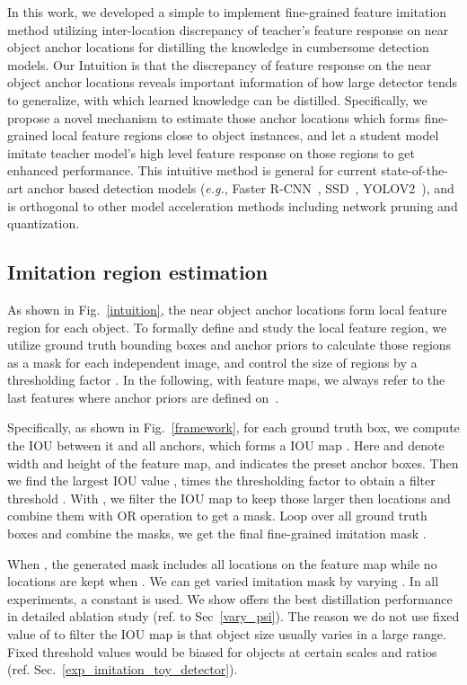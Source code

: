 \documentclass[10pt,twocolumn,letterpaper]{article}
\begin{document}
In this work, we developed a simple to implement fine-grained feature imitation method utilizing inter-location discrepancy of teacher's feature response on near object anchor locations for distilling the knowledge in cumbersome detection models. Our Intuition is that the discrepancy of feature response on the near object anchor locations reveals important information of how large detector tends to generalize, with which learned knowledge can be distilled. Specifically, we propose a novel mechanism to estimate those anchor locations which forms fine-grained local feature regions close to object instances, and let a student model imitate teacher model's high level feature response on those regions to get enhanced performance. This intuitive method is general for current state-of-the-art anchor based detection models (\textit{e.g.}, Faster R-CNN~\cite{ren2015faster}, SSD~\cite{liu2016ssd}, YOLOV2~\cite{redmon2017yolo9000}), and is orthogonal to other model acceleration methods including network pruning and quantization.


\subsection{Imitation region estimation}
\label{sec_imitation_method}

As shown in Fig.~\ref{intuition}, the near object anchor locations form local feature region for each object. To formally define and study the local feature region,  we utilize ground truth bounding boxes and anchor priors to calculate those regions as a mask  for each independent image, and control the size of regions by a thresholding factor . In the following, with feature maps, we always refer to the  last features where anchor priors are defined on~\cite{ren2015faster}.

Specifically, as shown in Fig.~\ref{framework}, for each ground truth box, we compute the IOU between it and all anchors, which forms a  IOU map . Here  and  denote  width and height of the feature map, and  indicates the  preset anchor boxes. Then we find the largest IOU value , times the thresholding factor  to obtain a filter threshold . With , we filter the IOU map to keep those larger then  locations and combine them with OR operation to get a  mask. Loop over all ground truth boxes and combine the masks, we get the final fine-grained imitation mask .

When , the generated mask includes all locations on the feature map while no locations are kept when . We can get varied imitation mask by varying . In all experiments, a constant  is used. We show  offers the best distillation performance in detailed ablation study (ref. to Sec~\ref{vary_psi}). The reason we do not use fixed value of  to filter the IOU map is that object size usually varies in a large range. Fixed threshold values would be biased for objects at certain scales and ratios (ref. Sec.~\ref{exp_imitation_toy_detector}).
\end{document}
